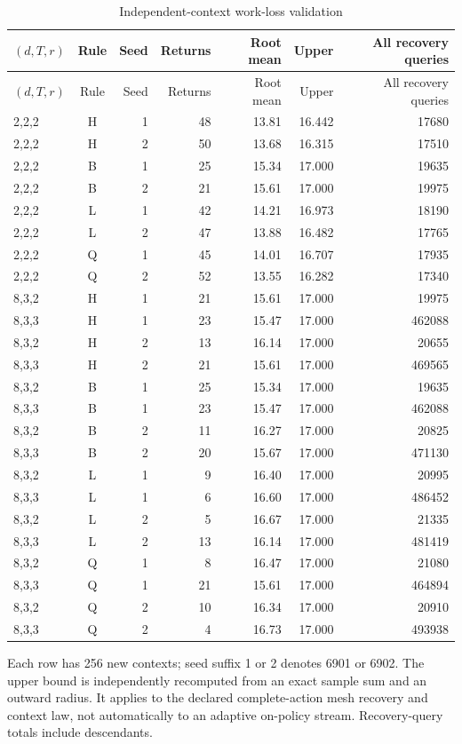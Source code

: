 \begingroup\small\setlength{\tabcolsep}{3pt}
\begin{longtable}{lcrrrrr}
\caption{Independent-context work-loss validation}\label{tab:validation70}\\
\hline
$(d,T,r)$ & Rule & Seed & Returns & Root mean & Upper & All recovery queries \\
\hline\endfirsthead
\hline
$(d,T,r)$ & Rule & Seed & Returns & Root mean & Upper & All recovery queries \\
\hline\endhead
2,2,2 & H & 1 & 48 & 13.81 & 16.442 & 17680 \\
2,2,2 & H & 2 & 50 & 13.68 & 16.315 & 17510 \\
2,2,2 & B & 1 & 25 & 15.34 & 17.000 & 19635 \\
2,2,2 & B & 2 & 21 & 15.61 & 17.000 & 19975 \\
2,2,2 & L & 1 & 42 & 14.21 & 16.973 & 18190 \\
2,2,2 & L & 2 & 47 & 13.88 & 16.482 & 17765 \\
2,2,2 & Q & 1 & 45 & 14.01 & 16.707 & 17935 \\
2,2,2 & Q & 2 & 52 & 13.55 & 16.282 & 17340 \\
8,3,2 & H & 1 & 21 & 15.61 & 17.000 & 19975 \\
8,3,3 & H & 1 & 23 & 15.47 & 17.000 & 462088 \\
8,3,2 & H & 2 & 13 & 16.14 & 17.000 & 20655 \\
8,3,3 & H & 2 & 21 & 15.61 & 17.000 & 469565 \\
8,3,2 & B & 1 & 25 & 15.34 & 17.000 & 19635 \\
8,3,3 & B & 1 & 23 & 15.47 & 17.000 & 462088 \\
8,3,2 & B & 2 & 11 & 16.27 & 17.000 & 20825 \\
8,3,3 & B & 2 & 20 & 15.67 & 17.000 & 471130 \\
8,3,2 & L & 1 & 9 & 16.40 & 17.000 & 20995 \\
8,3,3 & L & 1 & 6 & 16.60 & 17.000 & 486452 \\
8,3,2 & L & 2 & 5 & 16.67 & 17.000 & 21335 \\
8,3,3 & L & 2 & 13 & 16.14 & 17.000 & 481419 \\
8,3,2 & Q & 1 & 8 & 16.47 & 17.000 & 21080 \\
8,3,3 & Q & 1 & 21 & 15.61 & 17.000 & 464894 \\
8,3,2 & Q & 2 & 10 & 16.34 & 17.000 & 20910 \\
8,3,3 & Q & 2 & 4 & 16.73 & 17.000 & 493938 \\
\hline
\end{longtable}\endgroup
{\footnotesize Each row has 256 new contexts; seed suffix 1 or 2 denotes 6901 or 6902. The upper bound is independently recomputed from an exact sample sum and an outward radius. It applies to the declared complete-action mesh recovery and context law, not automatically to an adaptive on-policy stream. Recovery-query totals include descendants.}\par
